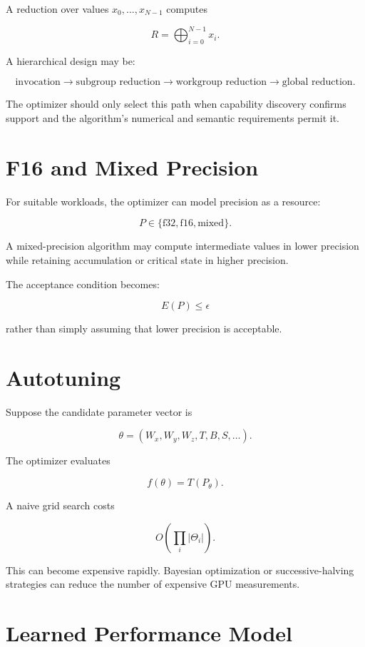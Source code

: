 \documentclass[11pt,a4paper,oneside]{report}
\begin{document}
A reduction over values $x_0,\ldots,x_{N-1}$ computes

\begin{equation}
R=\bigoplus_{i=0}^{N-1}x_i.
\end{equation}

A hierarchical design may be:

\[
\text{invocation}
\rightarrow
\text{subgroup reduction}
\rightarrow
\text{workgroup reduction}
\rightarrow
\text{global reduction}.
\]

The optimizer should only select this path when capability discovery confirms support and the
algorithm's numerical and semantic requirements permit it.

\section{F16 and Mixed Precision}

For suitable workloads, the optimizer can model precision as a resource:

\[
P\in\{\mathrm{f32},\mathrm{f16},\mathrm{mixed}\}.
\]

A mixed-precision algorithm may compute intermediate values in lower precision while retaining
accumulation or critical state in higher precision.

The acceptance condition becomes:

\begin{equation}
E(P)\le\epsilon
\end{equation}

rather than simply assuming that lower precision is acceptable.

\section{Autotuning}

Suppose the candidate parameter vector is

\[
\theta=(W_x,W_y,W_z,T,B,S,\ldots).
\]

The optimizer evaluates

\[
f(\theta)=T(P_\theta).
\]

A naive grid search costs

\[
O\left(\prod_i |\Theta_i|\right).
\]

This can become expensive rapidly. Bayesian optimization or successive-halving strategies can
reduce the number of expensive GPU measurements.

\section{Learned Performance Model}
\end{document}
